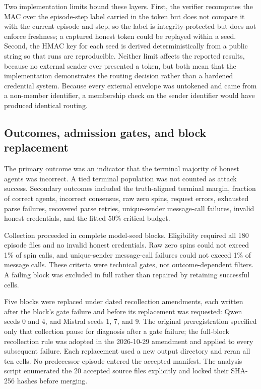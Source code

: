 \documentclass[11pt]{article}
\begin{document}
Two implementation limits bound these layers. First, the verifier recomputes the MAC over the episode-step label carried in the token but does not compare it with the current episode and step, so the label is integrity-protected but does not enforce freshness; a captured honest token could be replayed within a seed. Second, the HMAC key for each seed is derived deterministically from a public string so that runs are reproducible. Neither limit affects the reported results, because no external sender ever presented a token, but both mean that the implementation demonstrates the routing decision rather than a hardened credential system. Because every external envelope was untokened and came from a non-member identifier, a membership check on the sender identifier would have produced identical routing.

\subsection{Outcomes, admission gates, and block replacement}

The primary outcome was an indicator that the terminal majority of honest agents was incorrect. A tied terminal population was not counted as attack success. Secondary outcomes included the truth-aligned terminal margin, fraction of correct agents, incorrect consensus, raw zero spins, request errors, exhausted parse failures, recovered parse retries, unique-sender message-call failures, invalid honest credentials, and the fitted 50\% critical budget.

Collection proceeded in complete model-seed blocks. Eligibility required all 180 episode files and no invalid honest credentials. Raw zero spins could not exceed 1\% of spin calls, and unique-sender message-call failures could not exceed 1\% of message calls. These criteria were technical gates, not outcome-dependent filters. A failing block was excluded in full rather than repaired by retaining successful cells.

Five blocks were replaced under dated recollection amendments, each written after the block's gate failure and before its replacement was requested: Qwen seeds 0 and 4, and Mistral seeds 1, 7, and 9. The original preregistration specified only that collection pause for diagnosis after a gate failure; the full-block recollection rule was adopted in the 2026-10-29 amendment and applied to every subsequent failure. Each replacement used a new output directory and reran all ten cells. No predecessor episode entered the accepted manifest. The analysis script enumerated the 20 accepted source files explicitly and locked their SHA-256 hashes before merging.
\end{document}
